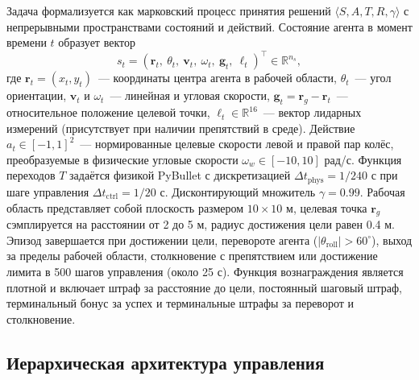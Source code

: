 \documentclass[11pt]{article}
\begin{document}
Задача формализуется как марковский процесс принятия решений
$\langle S, A, T, R, \gamma \rangle$ с непрерывными пространствами состояний
и действий. Состояние агента в момент времени $t$ образует вектор
\begin{equation}
s_t = (\mathbf{r}_t,\ \theta_t,\ \mathbf{v}_t,\ \omega_t,\ \mathbf{g}_t,\ \ell_t)^\top \in \mathbb{R}^{n_s},
\end{equation}
где $\mathbf{r}_t = (x_t, y_t)$~--- координаты центра агента в рабочей
области, $\theta_t$~--- угол ориентации, $\mathbf{v}_t$ и $\omega_t$~---
линейная и угловая скорости, $\mathbf{g}_t = \mathbf{r}_g - \mathbf{r}_t$~---
относительное положение целевой точки, $\ell_t \in \mathbb{R}^{16}$~---
вектор лидарных измерений (присутствует при наличии препятствий в среде).
Действие $a_t \in [-1, 1]^2$~--- нормированные целевые скорости левой
и правой пар колёс, преобразуемые в физические угловые скорости
$\omega_w \in [-10, 10]$ рад/с. Функция переходов $T$ задаётся физикой
PyBullet с дискретизацией $\Delta t_{\text{phys}} = 1/240$ с при шаге
управления $\Delta t_{\text{ctrl}} = 1/20$ с. Дисконтирующий множитель
$\gamma = 0.99$. Рабочая область представляет собой плоскость размером $10 \times 10$ м, целевая точка $\mathbf{r}_g$ сэмплируется на расстоянии
от 2 до 5 м, радиус достижения цели равен 0.4 м. Эпизод завершается при достижении цели, перевороте агента
($|\theta_{\text{roll}}| > 60^{\circ}$), выход за пределы рабочей области,
столкновение с препятствием или достижение лимита в 500 шагов управления
(около 25 с). Функция вознаграждения является плотной и включает штраф
за расстояние до цели, постоянный шаговый штраф, терминальный бонус
за успех и терминальные штрафы за переворот и столкновение.


\subsection{Иерархическая архитектура управления}
\label{sec:architecture}
\end{document}
